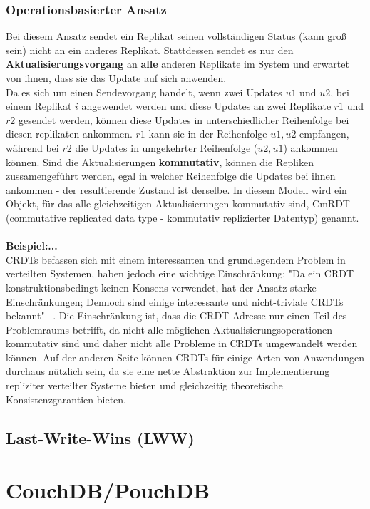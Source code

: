 \subsubsection{Operationsbasierter Ansatz}
Bei diesem Ansatz sendet ein Replikat seinen vollständigen Status (kann groß sein) nicht an ein anderes Replikat. Stattdessen sendet es nur den \textbf{Aktualisierungsvorgang} an \textbf{alle} anderen Replikate im System und erwartet von ihnen, dass sie das Update auf sich anwenden.\\
Da es sich um einen Sendevorgang handelt, wenn zwei Updates $u1$ und $u2$, bei einem Replikat $i$ angewendet werden und diese Updates an zwei Replikate $r1$ und $r2$ gesendet werden, können diese Updates in unterschiedlicher Reihenfolge bei diesen replikaten ankommen. $r1$ kann sie in der Reihenfolge $u1, u2$ empfangen, während bei $r2$ die Updates in umgekehrter Reihenfolge ($u2, u1$) ankommen können. Sind die Aktualisierungen \textbf{kommutativ}, können die Repliken zussamengeführt werden, egal in welcher Reihenfolge die Updates bei ihnen ankommen - der resultierende Zustand ist derselbe. In diesem Modell wird ein Objekt, für das alle gleichzeitigen Aktualisierungen kommutativ sind, CmRDT (commutative replicated data type - kommutativ replizierter Datentyp) genannt. \\\\
\textbf{Beispiel:...}\\
CRDTs befassen sich mit einem interessanten und grundlegendem Problem in verteilten Systemen, haben jedoch eine wichtige Einschränkung: "Da ein CRDT konstruktionsbedingt keinen Konsens verwendet, hat der Ansatz starke Einschränkungen; Dennoch sind einige interessante und nicht-triviale CRDTs bekannt" ~\cite{crdt_shapiro2}. Die Einschränkung ist, dass die CRDT-Adresse nur einen Teil des Problemraums betrifft, da nicht alle möglichen Aktualisierungsoperationen kommutativ sind und daher nicht alle Probleme in CRDTs umgewandelt werden können. Auf der anderen Seite können CRDTs für einige Arten von Anwendungen durchaus nützlich sein, da sie eine nette Abstraktion zur Implementierung repliziter verteilter Systeme bieten und gleichzeitig theoretische Konsistenzgarantien bieten.
%
%
\subsection{Last-Write-Wins (LWW)}
%
%
\section{CouchDB/PouchDB}
